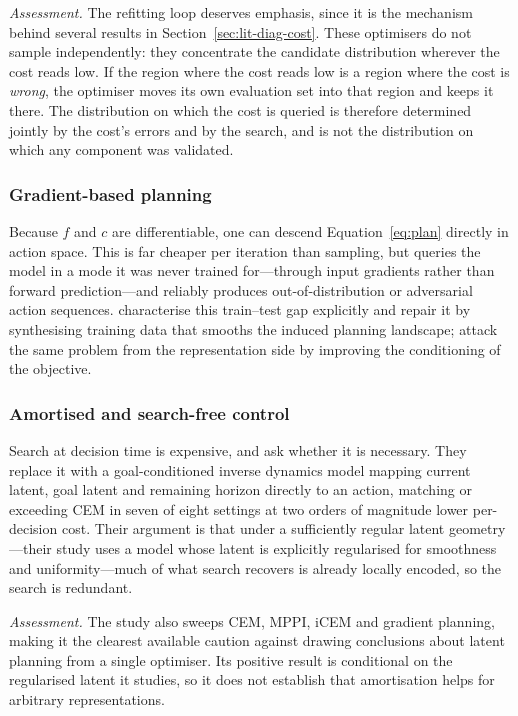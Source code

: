 \documentclass[11pt,letterpaper]{article}
\begin{document}
\emph{Assessment.} The refitting loop deserves emphasis, since it is the
mechanism behind several results in Section~\ref{sec:lit-diag-cost}. These
optimisers do not sample independently: they concentrate the candidate
distribution wherever the cost reads low. If the region where the cost reads low
is a region where the cost is \emph{wrong}, the optimiser moves its own
evaluation set into that region and keeps it there. The distribution on which
the cost is queried is therefore determined jointly by the cost's errors and by
the search, and is not the distribution on which any component was validated.

\subsubsection{Gradient-based planning}

Because $f$ and $c$ are differentiable, one can descend Equation~\eqref{eq:plan}
directly in action space. This is far cheaper per iteration than sampling, but
queries the model in a mode it was never trained for---through input gradients
rather than forward prediction---and reliably produces out-of-distribution or
adversarial action sequences. \citet{parthasarathy2025traintest} characterise
this train--test gap explicitly and repair it by synthesising training data that
smooths the induced planning landscape; \citet{straightening2026} attack the same
problem from the representation side by improving the conditioning of the
objective.

\subsubsection{Amortised and search-free control}

Search at decision time is expensive, and \citet{nguyen2026latentgeometry} ask
whether it is necessary. They replace it with a goal-conditioned inverse
dynamics model mapping current latent, goal latent and remaining horizon
directly to an action, matching or exceeding CEM in seven of eight settings at
two orders of magnitude lower per-decision cost. Their argument is that under a
sufficiently regular latent geometry---their study uses a model whose latent is
explicitly regularised for smoothness and uniformity---much of what search
recovers is already locally encoded, so the search is redundant.

\emph{Assessment.} The study also sweeps CEM, MPPI, iCEM and gradient planning,
making it the clearest available caution against drawing conclusions about
latent planning from a single optimiser. Its positive result is conditional on
the regularised latent it studies, so it does not establish that amortisation
helps for arbitrary representations.
\end{document}
